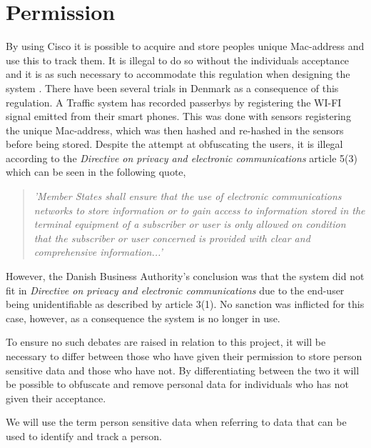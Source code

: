 \section{Permission} \label{sec:permission}
By using Cisco it is possible to acquire and store peoples unique Mac-address and use this to track them. It is illegal to do so without the individuals acceptance and it is as such necessary to accommodate this regulation when designing the system \cite{TrafficIlligal}.
There have been several trials in Denmark as a consequence of this regulation. A Traffic system has recorded passerbys by registering the WI-FI signal emitted from their smart phones. This was done with sensors registering the unique Mac-address, which was then hashed and re-hashed in the sensors before being stored. Despite the attempt at obfuscating the users\cite{TrafficIlligal}, it is illegal according to the \textit{Directive on privacy and electronic communications} article 5(3)\cite{CookieDirective} which can be seen in the following quote,

\begin{quote}
\textit{'Member States shall ensure that the use of electronic communications networks to store information or to gain access to information stored in the terminal equipment of a subscriber or user is only allowed on condition that the subscriber or user concerned is provided with clear and comprehensive information...'}
\end{quote}

However, the Danish Business Authority's conclusion was that the system did not fit in \textit{Directive on privacy and electronic communications} due to the end-user being unidentifiable\cite{TrafficOK} as described by article 3(1)\cite{CookieDirective}. No sanction was inflicted for this case, however, as a consequence the system is no longer in use.

To ensure no such debates are raised in relation to this project, it will be necessary to differ between those who have given their permission to store person sensitive data and those who have not. By differentiating between the two it will be possible to obfuscate and remove personal data for individuals who has not given their acceptance.

We will use the term person sensitive data when referring to data that can be used to identify and track a person. 
